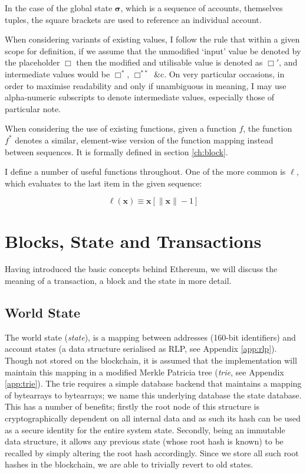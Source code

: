 \documentclass[9pt,oneside]{amsart}
\begin{document}
\begin{multicols}{2}
In the case of the global state $\boldsymbol{\sigma}$, which is a sequence of accounts, themselves tuples, the square brackets are used to reference an individual account.

When considering variants of existing values, I follow the rule that within a given scope for definition, if we assume that the unmodified `input' value be denoted by the placeholder $\Box$ then the modified and utilisable value is denoted as $\Box'$, and intermediate values would be $\Box^*$,  $\Box^{**}$ \&c. On very particular occasions, in order to maximise readability and only if unambiguous in meaning, I may use alpha-numeric subscripts to denote intermediate values, especially those of particular note.

When considering the use of existing functions, given a function $f$, the function $f^*$ denotes a similar, element-wise version of the function mapping instead between sequences. It is formally defined in section \ref{ch:block}.

I define a number of useful functions throughout. One of the more common is $\ell$, which evaluates to the last item in the given sequence:

\begin{equation}
\ell(\mathbf{x}) \equiv \mathbf{x}[\lVert \mathbf{x} \rVert - 1]
\end{equation}

\section{Blocks, State and Transactions} \label{ch:bst}

Having introduced the basic concepts behind Ethereum, we will discuss the meaning of a transaction, a block and the state in more detail.

\subsection{World State} \label{ch:state}

The world state (\textit{state}), is a mapping between addresses (160-bit identifiers) and account states (a data structure serialised as RLP, see Appendix \ref{app:rlp}). Though not stored on the blockchain, it is assumed that the implementation will maintain this mapping in a modified Merkle Patricia tree (\textit{trie}, see Appendix \ref{app:trie}). The trie requires a simple database backend that maintains a mapping of bytearrays to bytearrays; we name this underlying database the state database. This has a number of benefits; firstly the root node of this structure is cryptographically dependent on all internal data and as such its hash can be used as a secure identity for the entire system state. Secondly, being an immutable data structure, it allows any previous state (whose root hash is known) to be recalled by simply altering the root hash accordingly. Since we store all such root hashes in the blockchain, we are able to trivially revert to old states.


\end{multicols}
\end{document}
